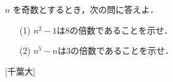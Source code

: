 \documentclass[a4paper,11pt]{ltjsarticle}
\begin{document}
\begin{toi}
$n$ を奇数とするとき，次の問に答えよ．
\begin{itemize}
    \item [(1)]$n^2-1$は8の倍数であることを示せ．
    \item [(2)]$n^5-n$は3の倍数であることを示せ．
\end{itemize}
\hfill[千葉大]
\end{toi}
\end{document}
